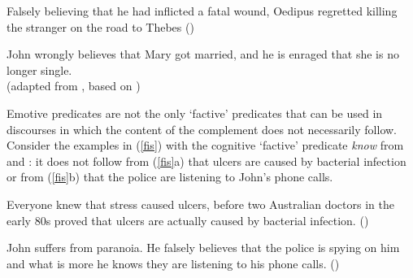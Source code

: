 \documentclass[11pt,fleqn]{article}
\newcommand{\6}{\mbox{$[\hspace*{-.6mm}[$}}
\newcommand{\9}{\mbox{$]\hspace*{-.6mm}]$}}
\begin{document}
\begin{exe}

\ex\label{emotive2}

\begin{xlist}

\ex Falsely believing that he had inflicted a fatal wound, Oedipus regretted killing the stranger on the road to Thebes \hfill (\citealt{klein1975})

\ex John wrongly believes that Mary got married, and he is enraged that she is no longer single. \\ \hspace*{.2cm} \hfill (adapted from \citealt{egre2008}, based on \citealt{schlenker03})

\end{xlist}

\end{exe}
Emotive predicates are not the only `factive' predicates that can be used in discourses in which the content of the complement does not necessarily follow. Consider the examples in (\ref{fis}) with the cognitive `factive' predicate {\em know} from  \citealt{hazlett2010} and \citealt{abrusan2011}:  it does not follow from (\ref{fis}a) that ulcers are caused by bacterial infection or from (\ref{fis}b) that the police are listening to John's phone calls. 

\begin{exe}
\ex\label{fis}
\begin{xlist}

\ex Everyone knew that stress caused ulcers, before two Australian doctors in the early 80s proved that ulcers are actually caused by bacterial infection. \hfill (\citealt[501]{hazlett2010})

\ex John suffers from paranoia. He falsely believes that the police is spying on him and what is more he knows they are listening to his phone calls. \hfill (\citealt[514]{abrusan2011})



\end{xlist}

\end{exe}
\end{document}
